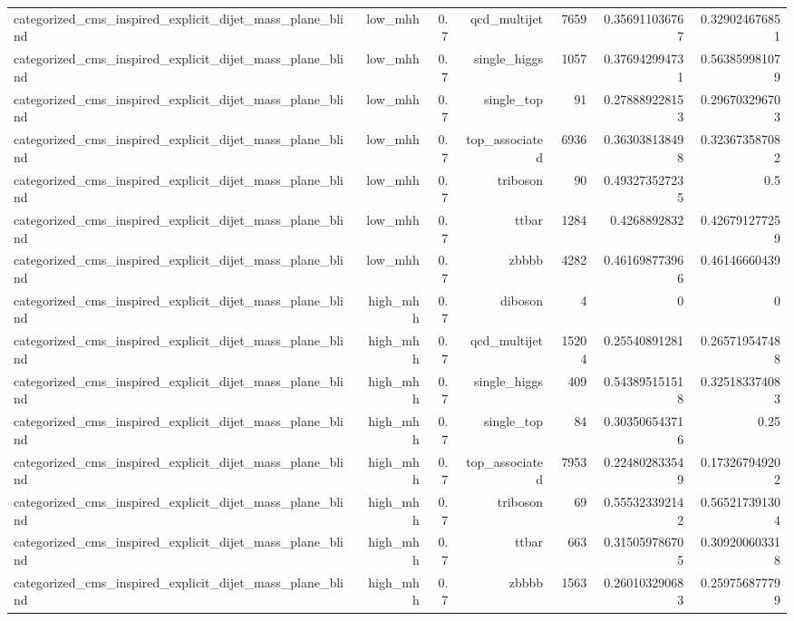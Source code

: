 \begin{table}[htbp]
{\begin{tabular}{lrrrrrr}
categorized\_cms\_inspired\_explicit\_dijet\_mass\_plane\_blind & low\_mhh & 0.7 & qcd\_multijet & 7659 & 0.356911036767 & 0.329024676851 \\
categorized\_cms\_inspired\_explicit\_dijet\_mass\_plane\_blind & low\_mhh & 0.7 & single\_higgs & 1057 & 0.376942994731 & 0.563859981079 \\
categorized\_cms\_inspired\_explicit\_dijet\_mass\_plane\_blind & low\_mhh & 0.7 & single\_top & 91 & 0.278889228153 & 0.296703296703 \\
categorized\_cms\_inspired\_explicit\_dijet\_mass\_plane\_blind & low\_mhh & 0.7 & top\_associated & 6936 & 0.363038138498 & 0.323673587082 \\
categorized\_cms\_inspired\_explicit\_dijet\_mass\_plane\_blind & low\_mhh & 0.7 & triboson & 90 & 0.493273527235 & 0.5 \\
categorized\_cms\_inspired\_explicit\_dijet\_mass\_plane\_blind & low\_mhh & 0.7 & ttbar & 1284 & 0.4268892832 & 0.426791277259 \\
categorized\_cms\_inspired\_explicit\_dijet\_mass\_plane\_blind & low\_mhh & 0.7 & zbbbb & 4282 & 0.461698773966 & 0.46146660439 \\
categorized\_cms\_inspired\_explicit\_dijet\_mass\_plane\_blind & high\_mhh & 0.7 & diboson & 4 & 0 & 0 \\
categorized\_cms\_inspired\_explicit\_dijet\_mass\_plane\_blind & high\_mhh & 0.7 & qcd\_multijet & 15204 & 0.25540891281 & 0.265719547488 \\
categorized\_cms\_inspired\_explicit\_dijet\_mass\_plane\_blind & high\_mhh & 0.7 & single\_higgs & 409 & 0.543895151518 & 0.325183374083 \\
categorized\_cms\_inspired\_explicit\_dijet\_mass\_plane\_blind & high\_mhh & 0.7 & single\_top & 84 & 0.303506543716 & 0.25 \\
categorized\_cms\_inspired\_explicit\_dijet\_mass\_plane\_blind & high\_mhh & 0.7 & top\_associated & 7953 & 0.224802833549 & 0.173267949202 \\
categorized\_cms\_inspired\_explicit\_dijet\_mass\_plane\_blind & high\_mhh & 0.7 & triboson & 69 & 0.555323392142 & 0.565217391304 \\
categorized\_cms\_inspired\_explicit\_dijet\_mass\_plane\_blind & high\_mhh & 0.7 & ttbar & 663 & 0.315059786705 & 0.309200603318 \\
categorized\_cms\_inspired\_explicit\_dijet\_mass\_plane\_blind & high\_mhh & 0.7 & zbbbb & 1563 & 0.260103290683 & 0.259756877799 \\

\end{tabular}}
\end{table}
